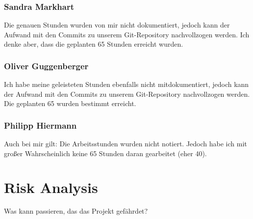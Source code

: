 \documentclass{article}
\begin{document}
\subsubsection{Sandra Markhart}

Die genauen Stunden wurden von mir nicht dokumentiert, jedoch kann der Aufwand mit den Commits zu unserem Git-Repository nachvollzogen werden. Ich denke aber, dass die geplanten 65 Stunden erreicht wurden.

\subsubsection{Oliver Guggenberger}

Ich habe meine geleisteten Stunden ebenfalls nicht mitdokumentiert, jedoch kann der Aufwand mit den Commits zu unserem Git-Repository nachvollzogen werden. Die geplanten 65 wurden bestimmt erreicht.

\subsubsection{Philipp Hiermann}

Auch bei mir gilt: Die Arbeitsstunden wurden nicht notiert. Jedoch habe ich mit großer Wahrscheinlich keine 65 Stunden daran gearbeitet (eher 40).

\section{Risk Analysis}

Was kann passieren, das das Projekt gefährdet?
\end{document}
